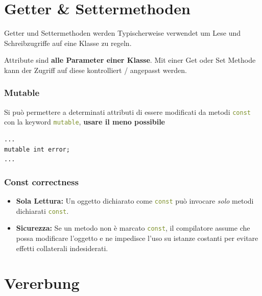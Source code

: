 \section{Getter \& Settermethoden}

Getter und Settermethoden werden Typischerweise verwendet um Lese und Schreibzugriffe auf eine Klasse zu regeln.

Attribute sind \textbf{alle Parameter einer Klasse}.
Mit einer Get oder Set Methode kann der Zugriff auf diese kontrolliert / angepasst werden.\medskip





\subsubsection{Mutable}
Si può permettere a determinati attributi di essere 
modificati da metodi \lstinline[language=C++]|const| con la keyword \lstinline[language=C++]|mutable|,
\textbf{usare il meno possibile}
\begin{lstlisting}
...
mutable int error;
...
\end{lstlisting}

\subsubsection{Const correctness}
\begin{itemize}
    \item \textbf{Sola Lettura:} Un oggetto dichiarato come \lstinline[language=C++]|const| può invocare \textit{solo} metodi dichiarati \lstinline[language=C++]|const|.
    \item \textbf{Sicurezza:} Se un metodo non è marcato \lstinline[language=C++]|const|, il compilatore assume che possa modificare l'oggetto e ne impedisce l'uso su istanze costanti per evitare effetti collaterali indesiderati.
\end{itemize}

\example{}


\section{Vererbung}

